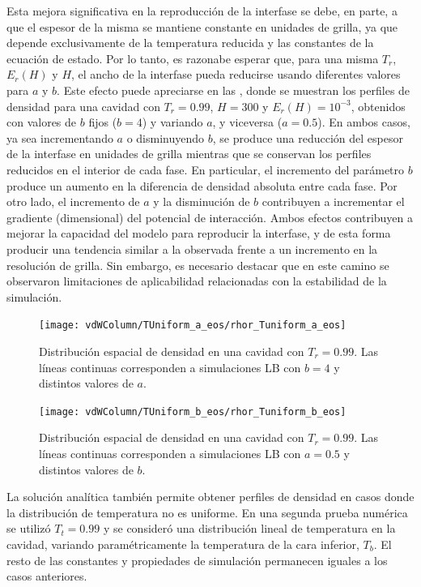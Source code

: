 Esta mejora significativa en la reproducci\'on de la interfase se debe, en parte, a que el espesor de la misma se mantiene constante en unidades de grilla, ya que depende exclusivamente de la temperatura reducida y las constantes de la ecuaci\'on de estado. Por lo tanto, es razonabe esperar que, para una misma $T_r$, $E_r(H)$ y $H$, el ancho de la interfase pueda reducirse usando diferentes valores para $a$ y $b$. Este efecto puede apreciarse en las , donde se muestran los perfiles de densidad para una cavidad con $T_r=0.99$, $H=300$ y $E_r(H)=10^{-3}$, obtenidos con valores de $b$ fijos ($b=4$) y variando $a$, y viceversa ($a=0.5$). En ambos casos, ya sea incrementando $a$ o disminuyendo $b$, se produce una reducci\'on del espesor de la interfase en unidades de grilla mientras que se conservan los perfiles reducidos en el interior de cada fase. En particular, el incremento del par\'ametro $b$ produce un aumento en la diferencia de densidad absoluta entre cada fase. Por otro lado, el incremento de $a$ y la disminuci\'on de $b$ contribuyen a incrementar el gradiente (dimensional) del potencial de interacci\'on. Ambos efectos contribuyen a mejorar la capacidad del modelo \pp{} para reproducir la interfase, y de esta forma producir una tendencia similar a la observada frente a un incremento en la resoluci\'on de grilla. Sin embargo, es necesario destacar que en este camino se observaron limitaciones de aplicabilidad relacionadas con la estabilidad de la simulaci\'on.

\begin{figure}[ht]
	\centering
	\texttt{[image: vdWColumn/TUniform\_a\_eos/rhor\_Tuniform\_a\_eos]}
	\caption{Distribuci\'on espacial de densidad en una cavidad con $T_r = 0.99$. Las l\'ineas continuas corresponden a simulaciones LB con $b=4$ y distintos valores de $a$.}
	\label{fig:vdWColumn_a_eos}
\end{figure}

\begin{figure}[ht]
	\centering
	\texttt{[image: vdWColumn/TUniform\_b\_eos/rhor\_Tuniform\_b\_eos]}
	\caption{Distribuci\'on espacial de densidad en una cavidad con $T_r = 0.99$. Las l\'ineas continuas corresponden a simulaciones LB con $a=0.5$ y distintos valores de $b$.}
	\label{fig:vdWColumn_b_eos}
\end{figure}
\FloatBarrier

La soluci\'on anal\'itica tambi\'en permite obtener perfiles de densidad en casos donde la distribuci\'on de temperatura no es uniforme. En una segunda prueba num\'erica se utiliz\'o $T_t=0.99$ y se consider\'o una distribuci\'on lineal de temperatura en la cavidad, variando param\'etricamente la temperatura de la cara inferior, $T_b$. El resto de las constantes y propiedades de simulaci\'on permanecen iguales a los casos anteriores.

